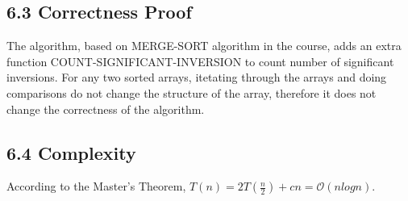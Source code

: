 \documentclass[UTF8]{ctexart}
\begin{document}
\subsection*{6.3 Correctness Proof} 
The algorithm, based on MERGE-SORT algorithm in the course, adds an extra function COUNT-SIGNIFICANT-INVERSION to 
count number of significant inversions. For any two sorted arrays, itetating through the arrays and doing comparisons do not 
change the structure of the array, therefore it does not change the correctness of the algorithm.
\subsection*{6.4 Complexity} 
According to the Master's Theorem, $T(n) = 2T(\frac{n}{2}) + cn = \mathcal{O}(n logn)$. 

\end{document}
